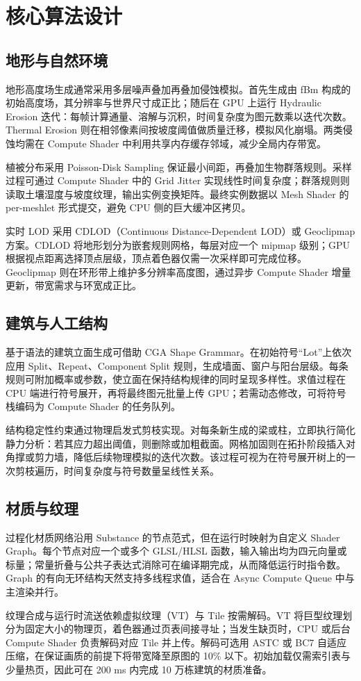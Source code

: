 \chapter{核心算法设计}
\section{地形与自然环境}
地形高度场生成通常采用多层噪声叠加再叠加侵蚀模拟。首先生成由 fBm 构成的初始高度场，其分辨率与世界尺寸成正比；随后在 GPU 上运行 Hydraulic Erosion 迭代：每帧计算通量、溶解与沉积，时间复杂度为图元数乘以迭代次数。Thermal Erosion 则在相邻像素间按坡度阈值做质量迁移，模拟风化崩塌。两类侵蚀均需在 Compute Shader 中利用共享内存缓存邻域，减少全局内存带宽。\par
植被分布采用 Poisson-Disk Sampling 保证最小间距，再叠加生物群落规则。采样过程可通过 Compute Shader 中的 Grid Jitter 实现线性时间复杂度；群落规则则读取土壤湿度与坡度纹理，输出实例变换矩阵。最终实例数据以 Mesh Shader 的 per-meshlet 形式提交，避免 CPU 侧的巨大缓冲区拷贝。\par
实时 LOD 采用 CDLOD（Continuous Distance-Dependent LOD）或 Geoclipmap 方案。CDLOD 将地形划分为嵌套规则网格，每层对应一个 mipmap 级别；GPU 根据视点距离选择顶点层级，顶点着色器仅需一次采样即可完成位移。Geoclipmap 则在环形带上维护多分辨率高度图，通过异步 Compute Shader 增量更新，带宽需求与环宽成正比。\par
\section{建筑与人工结构}
基于语法的建筑立面生成可借助 CGA Shape Grammar。在初始符号“Lot”上依次应用 Split、Repeat、Component Split 规则，生成墙面、窗户与阳台层级。每条规则可附加概率或参数，使立面在保持结构规律的同时呈现多样性。求值过程在 CPU 端进行符号展开，再将最终图元批量上传 GPU；若需动态修改，可将符号栈编码为 Compute Shader 的任务队列。\par
结构稳定性约束通过物理启发式剪枝实现。对每条新生成的梁或柱，立即执行简化静力分析：若其应力超出阈值，则删除或加粗截面。网格加固则在拓扑阶段插入对角撑或剪力墙，降低后续物理模拟的迭代次数。该过程可视为在符号展开树上的一次剪枝遍历，时间复杂度与符号数量呈线性关系。\par
\section{材质与纹理}
过程化材质网络沿用 Substance 的节点范式，但在运行时映射为自定义 Shader Graph。每个节点对应一个或多个 GLSL/HLSL 函数，输入输出均为四元向量或标量；常量折叠与公共子表达式消除可在编译期完成，从而降低运行时指令数。Graph 的有向无环结构天然支持多线程求值，适合在 Async Compute Queue 中与主渲染并行。\par
纹理合成与运行时流送依赖虚拟纹理（VT）与 Tile 按需解码。VT 将巨型纹理划分为固定大小的物理页，着色器通过页表间接寻址；当发生缺页时，CPU 或后台 Compute Shader 负责解码对应 Tile 并上传。解码可选用 ASTC 或 BC7 自适应压缩，在保证画质的前提下将带宽降至原图的 10\%{} 以下。初始加载仅需索引表与少量热页，因此可在 200 ms 内完成 10 万栋建筑的材质准备。\par
